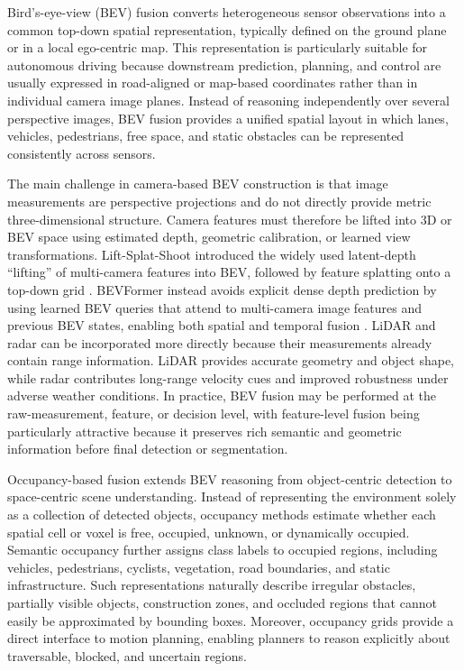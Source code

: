 %

Bird's-eye-view (BEV) fusion converts heterogeneous sensor observations into a common top-down spatial representation, typically defined on the ground plane or in a local ego-centric map. This representation is particularly suitable for autonomous driving because downstream prediction, planning, and control are usually expressed in road-aligned or map-based coordinates rather than in individual camera image planes. Instead of reasoning independently over several perspective images, BEV fusion provides a unified spatial layout in which lanes, vehicles, pedestrians, free space, and static obstacles can be represented consistently across sensors.

The main challenge in camera-based BEV construction is that image measurements are perspective projections and do not directly provide metric three-dimensional structure. Camera features must therefore be lifted into 3D or BEV space using estimated depth, geometric calibration, or learned view transformations. Lift-Splat-Shoot introduced the widely used latent-depth ``lifting'' of multi-camera features into BEV, followed by feature splatting onto a top-down grid \cite{philion2020_lss}. BEVFormer instead avoids explicit dense depth prediction by using learned BEV queries that attend to multi-camera image features and previous BEV states, enabling both spatial and temporal fusion \cite{li2022_bevformer}. LiDAR and radar can be incorporated more directly because their measurements already contain range information. LiDAR provides accurate geometry and object shape, while radar contributes long-range velocity cues and improved robustness under adverse weather conditions. In practice, BEV fusion may be performed at the raw-measurement, feature, or decision level, with feature-level fusion being particularly attractive because it preserves rich semantic and geometric information before final detection or segmentation.

Occupancy-based fusion extends BEV reasoning from object-centric detection to space-centric scene understanding. Instead of representing the environment solely as a collection of detected objects, occupancy methods estimate whether each spatial cell or voxel is free, occupied, unknown, or dynamically occupied. Semantic occupancy further assigns class labels to occupied regions, including vehicles, pedestrians, cyclists, vegetation, road boundaries, and static infrastructure. Such representations naturally describe irregular obstacles, partially visible objects, construction zones, and occluded regions that cannot easily be approximated by bounding boxes. Moreover, occupancy grids provide a direct interface to motion planning, enabling planners to reason explicitly about traversable, blocked, and uncertain regions.

